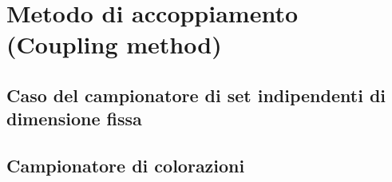 \documentclass[\main/main.tex]{subfiles}
\begin{document}
\section{Metodo di accoppiamento (Coupling method)}
\subsection{Caso del campionatore di set indipendenti di dimensione fissa}
\subsection{Campionatore di colorazioni}
\end{document}
